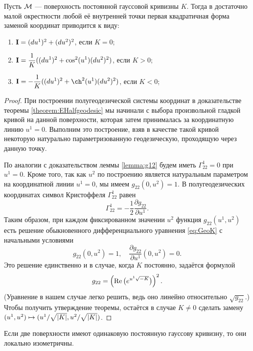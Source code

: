 \begin{theorem}
	Пусть $\mathcal{M}$ --- поверхность постоянной гауссовой кривизны $K$. Тогда в достаточно малой окрестности любой её внутренней точки первая квадратичная форма заменой координат приводится к виду:
	\begin{enumerate}[nolistsep, label=(\arabic*)]
		\item $\boldsymbol{\operatorname{I}} = (du^1)^2 + (du^2)^2$, если $K = 0$;
		\item $\displaystyle\boldsymbol{\operatorname{I}} = \frac{1}{K}((du^1)^2 + \cos^2(u^1)(du^2)^2)$, если $K > 0$;
		\item $\ds\I = -\frac{1}{K}((du^1)^2 + \ch^2(u^1)(du^2)^2)$, если $K < 0$;
	\end{enumerate}
\end{theorem}

\begin{proof}
	При построении полугеодезической системы координат в доказательстве теоремы \ref{theorem:EHalfgeodesic} мы начинали с выбора произвольной гладкой кривой на данной поверхности, которая затем принималась за координатную линию $u^1 = 0$. Выполним это построение, взяв в качестве такой кривой некоторую натурально параметризованную геодезическую, проходящую через данную точку.

	По аналогии с доказательством леммы \ref{lemma:g12} будем иметь $\Gamma_{22}^1 = 0$ при $u^1 = 0$. Кроме того, так как $u^2$ по построению является натуральным параметром на координатной линии $u^1 = 0$, мы имеем $g_{22}(0, u^2) = 1$. В полугеодезических координатах символ Кристоффеля $\Gamma_{22}^1$ равен
	\[
		\Gamma_{22}^1 = -\frac{1}{2}\frac{\partial g_{22}}{\partial u^1}.
	\]
	Таким образом, при каждом фиксированном значении $u^2$ функция $g_{22}(u^1, u^2)$ есть решение обыкновенного дифференциального уравнения \eqref{eq:GeoK} с начальными условиями
	\[
		g_{22}(0, u^2) = 1,\quad\frac{\partial g_{22}}{\partial u^1}(0, u^2) = 0.
	\]
	Это решение единственно и в случае, когда $K$ постоянно, задаётся формулой
	\[
		g_{22} = \left(\operatorname{Re}\big(e^{u^1\sqrt{-K}}\big)\right)^2.
	\]
	(Уравнение в нашем случае легко решить, ведь оно линейно относительно $\sqrt{g_{22}}$.) Чтобы получить утверждение теоремы, остаётся в случае $K \ne 0$ сделать замену $(u^1, u^2) \hm\mapsto (u^1 / \sqrt{\abs{K}}, u^2 / \sqrt{\abs{K}})$.
\end{proof}

\begin{corollary}
	Если две поверхности имеют одинаковую постоянную гауссову кривизну, то они локально изометричны.
\end{corollary}

